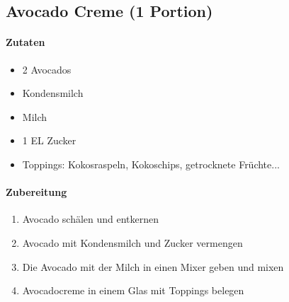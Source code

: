 \newpage
\subsection{Avocado Creme (1 Portion)}
\paragraph{Zutaten}
\begin{itemize}[noitemsep]
	\item 2 Avocados
	\item Kondensmilch
	\item Milch
	\item 1 EL Zucker
	\item Toppings: Kokosraspeln, Kokoschips, getrocknete Früchte...
\end{itemize}
\paragraph{Zubereitung}
\begin{enumerate}[noitemsep]
	\item Avocado schälen und entkernen
	\item Avocado mit Kondensmilch und Zucker vermengen
	\item Die Avocado mit der Milch in einen Mixer geben und mixen
	\item Avocadocreme in einem Glas mit Toppings belegen
\end{enumerate}
